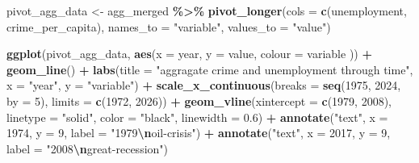 \documentclass[
]{article}
\newenvironment{Shaded}{\begin{snugshade}}{\end{snugshade}}
\newcommand{\AttributeTok}[1]{\textcolor[rgb]{0.13,0.29,0.53}{#1}}
\newcommand{\DecValTok}[1]{\textcolor[rgb]{0.00,0.00,0.81}{#1}}
\newcommand{\FloatTok}[1]{\textcolor[rgb]{0.00,0.00,0.81}{#1}}
\newcommand{\FunctionTok}[1]{\textcolor[rgb]{0.13,0.29,0.53}{\textbf{#1}}}
\newcommand{\NormalTok}[1]{#1}
\newcommand{\OtherTok}[1]{\textcolor[rgb]{0.56,0.35,0.01}{#1}}
\newcommand{\SpecialCharTok}[1]{\textcolor[rgb]{0.81,0.36,0.00}{\textbf{#1}}}
\newcommand{\StringTok}[1]{\textcolor[rgb]{0.31,0.60,0.02}{#1}}
\begin{document}
\begin{Shaded}
\begin{Highlighting}[]
\NormalTok{pivot\_agg\_data }\OtherTok{\textless{}{-}}\NormalTok{ agg\_merged }\SpecialCharTok{\%\textgreater{}\%}
  \FunctionTok{pivot\_longer}\NormalTok{(}\AttributeTok{cols =} \FunctionTok{c}\NormalTok{(unemployment, crime\_per\_capita), }\AttributeTok{names\_to =} \StringTok{"variable"}\NormalTok{, }\AttributeTok{values\_to =} \StringTok{"value"}\NormalTok{)}

\FunctionTok{ggplot}\NormalTok{(pivot\_agg\_data, }\FunctionTok{aes}\NormalTok{(}\AttributeTok{x =}\NormalTok{ year, }\AttributeTok{y =}\NormalTok{ value, }\AttributeTok{colour =}\NormalTok{ variable )) }\SpecialCharTok{+}
  \FunctionTok{geom\_line}\NormalTok{() }\SpecialCharTok{+}
  \FunctionTok{labs}\NormalTok{(}\AttributeTok{title =} \StringTok{"aggragate crime and unemployment through time"}\NormalTok{, }\AttributeTok{x =} \StringTok{"year"}\NormalTok{, }\AttributeTok{y =} \StringTok{"variable"}\NormalTok{) }\SpecialCharTok{+}
  \FunctionTok{scale\_x\_continuous}\NormalTok{(}\AttributeTok{breaks =} \FunctionTok{seq}\NormalTok{(}\DecValTok{1975}\NormalTok{, }\DecValTok{2024}\NormalTok{, }\AttributeTok{by =} \DecValTok{5}\NormalTok{), }\AttributeTok{limits =} \FunctionTok{c}\NormalTok{(}\DecValTok{1972}\NormalTok{, }\DecValTok{2026}\NormalTok{)) }\SpecialCharTok{+}
  \FunctionTok{geom\_vline}\NormalTok{(}\AttributeTok{xintercept =} \FunctionTok{c}\NormalTok{(}\DecValTok{1979}\NormalTok{, }\DecValTok{2008}\NormalTok{), }
             \AttributeTok{linetype =} \StringTok{"solid"}\NormalTok{, }
             \AttributeTok{color =} \StringTok{"black"}\NormalTok{, }
             \AttributeTok{linewidth =} \FloatTok{0.6}\NormalTok{) }\SpecialCharTok{+} 
  \FunctionTok{annotate}\NormalTok{(}\StringTok{"text"}\NormalTok{, }\AttributeTok{x =} \DecValTok{1974}\NormalTok{, }\AttributeTok{y =} \DecValTok{9}\NormalTok{, }\AttributeTok{label =} \StringTok{"1979}\SpecialCharTok{\textbackslash{}n}\StringTok{oil{-}crisis"}\NormalTok{) }\SpecialCharTok{+}
  \FunctionTok{annotate}\NormalTok{(}\StringTok{"text"}\NormalTok{, }\AttributeTok{x =} \DecValTok{2017}\NormalTok{, }\AttributeTok{y =} \DecValTok{9}\NormalTok{, }\AttributeTok{label =} \StringTok{"2008}\SpecialCharTok{\textbackslash{}n}\StringTok{great{-}recession"}\NormalTok{)}
\end{Highlighting}
\end{Shaded}
\end{document}
